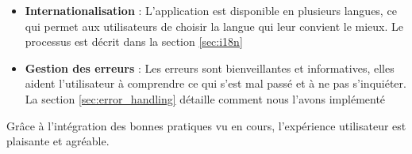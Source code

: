 \begin{itemize}[noitemsep]
    \item \textbf{Internationalisation} : L'application est disponible en plusieurs langues, ce qui permet aux utilisateurs de choisir la langue qui leur convient le mieux. Le processus est décrit dans la section \ref{sec:i18n}

    \item \textbf{Gestion des erreurs} : Les erreurs sont bienveillantes et informatives, elles aident l'utilisateur à comprendre ce qui s'est mal passé et à ne pas s'inquiéter. La section \ref{sec:error_handling} détaille comment nous l'avons implémenté
\end{itemize}

Grâce à l'intégration des bonnes pratiques vu en cours, l'expérience utilisateur est plaisante et agréable.

